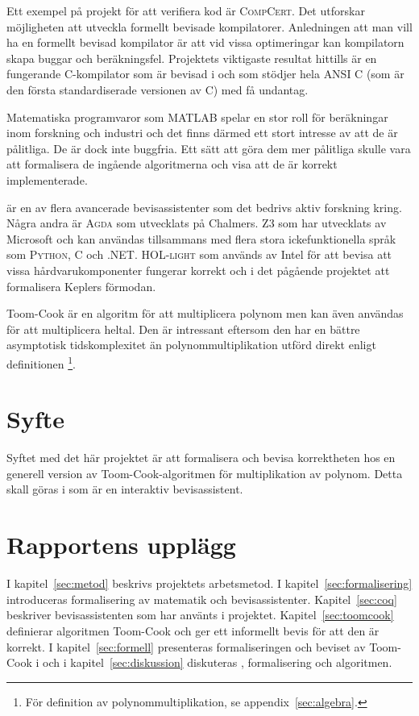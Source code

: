 Ett exempel på projekt för att verifiera kod är \textsc{CompCert}. Det
utforskar möjligheten att utveckla formellt bevisade kompilatorer. Anledningen
att man vill ha en formellt bevisad kompilator är att vid vissa optimeringar
kan kompilatorn skapa buggar och beräkningsfel. Projektets viktigaste resultat
hittills är en fungerande C-kompilator som är bevisad i \coq{} och som stödjer
hela \textsc{ANSI C} (som är den första standardiserade versionen av
\textsc{C}) med få undantag\cite{compcert}.

Matematiska programvaror som \textsc{MATLAB} spelar en stor roll för
beräkningar inom forskning och industri och det finns därmed ett stort intresse
av att de är pålitliga. De är dock inte buggfria. Ett sätt att göra dem mer
pålitliga skulle vara att formalisera de ingående algoritmerna och visa att de
är korrekt implementerade\cite{denes2012refinement}.

\coq{} är en av flera avancerade bevisassistenter som det bedrivs aktiv
forskning kring. Några andra är \textsc{Agda}\cite{Agda} som utvecklats på Chalmers.
\textsc{Z3}\cite{Z3} som har utvecklats av Microsoft och kan användas tillsammans med
flera stora ickefunktionella språk som \textsc{Python}, \textsc{C} och
\textsc{.NET}. \textsc{HOL-light} som används av Intel för att bevisa att vissa
hårdvarukomponenter fungerar korrekt och i det pågående projektet att
formalisera Keplers förmodan\cite{hales2008formal}.

Toom-Cook är en algoritm för att multiplicera polynom men kan även användas
för att multiplicera heltal. Den är intressant eftersom den har en bättre
asymptotisk tidskomplexitet än polynommultiplikation utförd direkt enligt
definitionen \footnote{För definition av polynommultiplikation, se
appendix~\ref{sec:algebra}.}.

\section{Syfte}
Syftet med det här projektet är att formalisera och bevisa korrektheten hos en
generell version av Toom-Cook-algoritmen för multiplikation av polynom. Detta
skall göras i \coq{} som är en interaktiv bevisassistent.

\section{Rapportens upplägg}
I kapitel~\ref{sec:metod} beskrivs projektets arbetsmetod. I
kapitel~\ref{sec:formalisering} introduceras formalisering av matematik och
bevisassistenter. Kapitel~\ref{sec:coq} beskriver bevisassistenten \coq{} som har
använts i projektet. Kapitel~\ref{sec:toomcook} definierar algoritmen Toom-Cook och
ger ett informellt bevis för att den är korrekt. I kapitel~\ref{sec:formell}
presenteras formaliseringen och beviset av Toom-Cook i \coq{} och i
kapitel~\ref{sec:diskussion} diskuteras \coq{}, formalisering och algoritmen.
